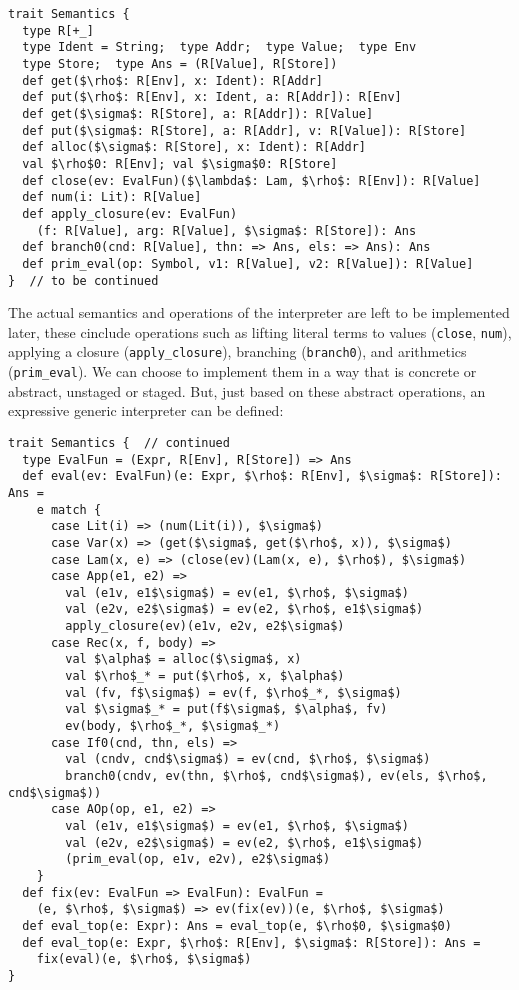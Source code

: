 \begin{lstlisting}
trait Semantics {
  type R[+_]
  type Ident = String;  type Addr;  type Value;  type Env
  type Store;  type Ans = (R[Value], R[Store])
  def get($\rho$: R[Env], x: Ident): R[Addr]
  def put($\rho$: R[Env], x: Ident, a: R[Addr]): R[Env]
  def get($\sigma$: R[Store], a: R[Addr]): R[Value]
  def put($\sigma$: R[Store], a: R[Addr], v: R[Value]): R[Store]
  def alloc($\sigma$: R[Store], x: Ident): R[Addr]
  val $\rho$0: R[Env]; val $\sigma$0: R[Store]
  def close(ev: EvalFun)($\lambda$: Lam, $\rho$: R[Env]): R[Value]
  def num(i: Lit): R[Value]
  def apply_closure(ev: EvalFun)
    (f: R[Value], arg: R[Value], $\sigma$: R[Store]): Ans
  def branch0(cnd: R[Value], thn: => Ans, els: => Ans): Ans
  def prim_eval(op: Symbol, v1: R[Value], v2: R[Value]): R[Value]
}  // to be continued
\end{lstlisting}

The actual semantics and operations of the interpreter are left to be implemented later, 
these cinclude operations such as lifting literal terms to values (\texttt{close}, \texttt{num}), 
applying a closure (\texttt{apply\_closure}), branching (\texttt{branch0}),
and arithmetics (\texttt{prim\_eval}). We can choose to implement them in a way that is concrete or abstract,
unstaged or staged.
But, just based on these abstract operations, an expressive generic interpreter can be defined:

\begin{lstlisting}
trait Semantics {  // continued
  type EvalFun = (Expr, R[Env], R[Store]) => Ans
  def eval(ev: EvalFun)(e: Expr, $\rho$: R[Env], $\sigma$: R[Store]): Ans = 
    e match {
      case Lit(i) => (num(Lit(i)), $\sigma$)
      case Var(x) => (get($\sigma$, get($\rho$, x)), $\sigma$)
      case Lam(x, e) => (close(ev)(Lam(x, e), $\rho$), $\sigma$)
      case App(e1, e2) =>
        val (e1v, e1$\sigma$) = ev(e1, $\rho$, $\sigma$)
        val (e2v, e2$\sigma$) = ev(e2, $\rho$, e1$\sigma$)
        apply_closure(ev)(e1v, e2v, e2$\sigma$)
      case Rec(x, f, body) =>
        val $\alpha$ = alloc($\sigma$, x)
        val $\rho$_* = put($\rho$, x, $\alpha$)
        val (fv, f$\sigma$) = ev(f, $\rho$_*, $\sigma$)
        val $\sigma$_* = put(f$\sigma$, $\alpha$, fv)
        ev(body, $\rho$_*, $\sigma$_*)
      case If0(cnd, thn, els) =>
        val (cndv, cnd$\sigma$) = ev(cnd, $\rho$, $\sigma$)
        branch0(cndv, ev(thn, $\rho$, cnd$\sigma$), ev(els, $\rho$, cnd$\sigma$))
      case AOp(op, e1, e2) =>
        val (e1v, e1$\sigma$) = ev(e1, $\rho$, $\sigma$)
        val (e2v, e2$\sigma$) = ev(e2, $\rho$, e1$\sigma$)
        (prim_eval(op, e1v, e2v), e2$\sigma$)
    }
  def fix(ev: EvalFun => EvalFun): EvalFun = 
    (e, $\rho$, $\sigma$) => ev(fix(ev))(e, $\rho$, $\sigma$)
  def eval_top(e: Expr): Ans = eval_top(e, $\rho$0, $\sigma$0)
  def eval_top(e: Expr, $\rho$: R[Env], $\sigma$: R[Store]): Ans = 
    fix(eval)(e, $\rho$, $\sigma$)
}
\end{lstlisting}

